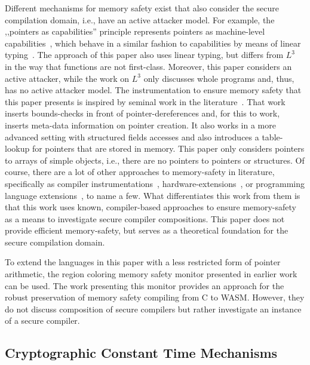 \documentclass[utf8,acmsmall,review,screen,dvipsnames,anonymous]{acmart}
\begin{document}
Different mechanisms for memory safety exist that also consider the secure compilation domain, i.e., have an active attacker model.
For example, the ,,pointers as capabilities'' principle represents pointers as machine-level capabilities~\cite{korashy2021capableptrs}, which behave in a similar fashion to capabilities by means of linear typing~\cite{morrisett2005L3}.
The approach of this paper also uses linear typing, but differs from $L^{3}$~\cite{morrisett2005L3} in the way that functions are not first-class.
Moreover, this paper considers an active attacker, while the work on $L^{3}$ only discusses whole programs and, thus, has no active attacker model.
The instrumentation to ensure memory safety that this paper presents is inspired by seminal work in the literature~\cite{nagarakatte2009soft}.
That work inserts bounds-checks in front of pointer-dereferences and, for this to work, inserts meta-data information on pointer creation.
It also works in a more advanced setting with structured fields accesses and also introduces a table-lookup for pointers that are stored in memory.
This paper only considers pointers to arrays of simple objects, i.e., there are no pointers to pointers or structures.
Of course, there are a lot of other approaches to memory-safety in literature, specifically as compiler instrumentations~\cite{akritidis2009baggy,younan2010paricheck,jung2021pico,shankaranarayana2023tailcheck,dhumbumroong2020boundwarden,nam2019framer,zhou2023fatptrs}, hardware-extensions~\cite{kwon2013lowfat,saileshwar2022heapcheck,chen2023flexpointer,kim2023whistle}, or programming language extensions~\cite{elliott2018checkedc,li2022formalcheckedc,jim2002cyclone,elliott2015guilt,west2005cuckoo,weis2019fyr,benoit2019uniqueness}, to name a few.
What differentiates this work from them is that this work uses known, compiler-based approaches to ensure memory-safety as a means to investigate secure compiler compositions.
This paper does not provide efficient memory-safety, but serves as a theoretical foundation for the secure compilation domain.

To extend the languages in this paper with a less restricted form of pointer arithmetic, the region coloring memory safety monitor presented in earlier work~\cite{michael2023mswasm} can be used.
The work presenting this monitor provides an approach for the robust preservation of memory safety compiling from C to WASM.
However, they do not discuss composition of secure compilers but rather investigate an instance of a secure compiler.

\subsection{Cryptographic Constant Time Mechanisms}\label{subsec:relw:cctmechs}
\end{document}
